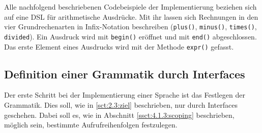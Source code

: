 Alle nachfolgend beschriebenen Codebeispiele der Implementierung beziehen sich auf eine DSL für arithmetische Ausdrücke. Mit ihr lassen sich Rechnungen in den vier Grundrechenarten in Infix-Notation beschreiben (\texttt{plus()}, \texttt{minus()}, \texttt{times()}, \texttt{divided}). Ein Ausdruck wird mit \texttt{begin()} eröffnet und mit \texttt{end()} abgeschlossen. Das erste Element eines Ausdrucks wird mit der Methode \texttt{expr()} gefasst.

\subsection{Definition einer Grammatik durch Interfaces}\label{ssct:4.3.1:grammatik}
Der erste Schritt bei der Implementierung einer Sprache ist das Festlegen der Grammatik. Dies soll, wie in \ref{sct:2.3:ziel} beschrieben, nur durch Interfaces geschehen. Dabei soll es, wie in Abschnitt \ref{ssct:4.1.3:scoping} beschrieben, möglich sein, bestimmte Aufrufreihenfolgen festzulegen. 